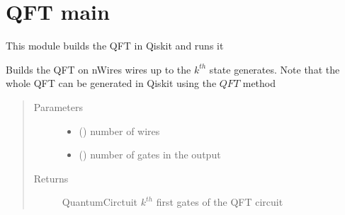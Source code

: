 \documentclass[letterpaper,10pt,english]{sphinxmanual}
\begin{document}
\chapter{QFT main}
\label{\detokenize{QFT:module-mermin_on_qiskit.QFT}}\label{\detokenize{QFT:qft-main}}\label{\detokenize{QFT::doc}}
This module builds the QFT in Qiskit and runs it

\begin{fulllineitems}
\label{\detokenize{QFT:mermin_on_qiskit.QFT.QFT_lenght}}
\end{fulllineitems}


\begin{fulllineitems}
\label{\detokenize{QFT:mermin_on_qiskit.QFT.all_QFT_circuits}}
\end{fulllineitems}


\begin{fulllineitems}
\label{\detokenize{QFT:mermin_on_qiskit.QFT.build_QFT_0_to_k}}
Builds the QFT on nWires wires up to the \(k^{th}\) state generates.
Note that the whole QFT can be generated in Qiskit using the \(QFT\) method
\begin{quote}\begin{description}
\item[{Parameters}] \leavevmode\begin{itemize}
\item {} 
 () \textendash{} number of wires

\item {} 
 () \textendash{} number of gates in the output

\end{itemize}

\item[{Returns}] \leavevmode
QuantumCirctuit \textendash{} \(k^{th}\) first gates of the QFT circuit

\end{description}\end{quote}

\end{fulllineitems}
\end{document}
